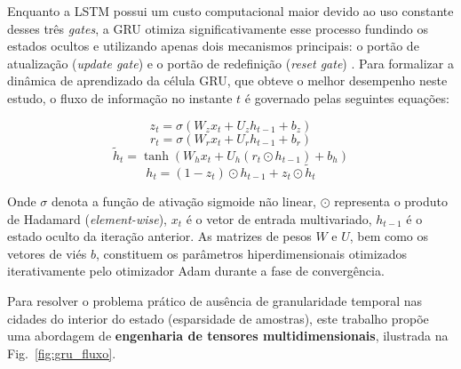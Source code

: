 \documentclass[12pt,a4paper]{article}
\begin{document}
Enquanto a LSTM possui um custo computacional maior devido ao uso constante desses três \textit{gates}, a GRU otimiza significativamente esse processo fundindo os estados ocultos e utilizando apenas dois mecanismos principais: o portão de atualização (\textit{update gate}) e o portão de redefinição (\textit{reset gate}) \cite{cho2014learning}. Para formalizar a dinâmica de aprendizado da célula GRU, que obteve o melhor desempenho neste estudo, o fluxo de informação no instante $t$ é governado pelas seguintes equações:

$$z_t = \sigma(W_z x_t + U_z h_{t-1} + b_z)$$
$$r_t = \sigma(W_r x_t + U_r h_{t-1} + b_r)$$
$$\tilde{h}_t = \tanh(W_h x_t + U_h (r_t \odot h_{t-1}) + b_h)$$
$$h_t = (1 - z_t) \odot h_{t-1} + z_t \odot \tilde{h}_t$$

Onde $\sigma$ denota a função de ativação sigmoide não linear, $\odot$ representa o produto de Hadamard (\textit{element-wise}), $x_t$ é o vetor de entrada multivariado, $h_{t-1}$ é o estado oculto da iteração anterior. As matrizes de pesos $W$ e $U$, bem como os vetores de viés $b$, constituem os parâmetros hiperdimensionais otimizados iterativamente pelo otimizador Adam durante a fase de convergência.

Para resolver o problema prático de ausência de granularidade temporal nas cidades do interior do estado (esparsidade de amostras), este trabalho propõe uma abordagem de \textbf{engenharia de tensores multidimensionais}, ilustrada na Fig.~\ref{fig:gru_fluxo}.
\end{document}
